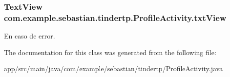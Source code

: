 \subsubsection[{\texorpdfstring{txt\+View}{txtView}}]{\setlength{\rightskip}{0pt plus 5cm}Text\+View com.\+example.\+sebastian.\+tindertp.\+Profile\+Activity.\+txt\+View\hspace{0.3cm}{\ttfamily [private]}}\hypertarget{classcom_1_1example_1_1sebastian_1_1tindertp_1_1ProfileActivity_afdb1940583ff0f43cf6e1c96e6ab1bb8}{}\label{classcom_1_1example_1_1sebastian_1_1tindertp_1_1ProfileActivity_afdb1940583ff0f43cf6e1c96e6ab1bb8}
En caso de error. 

The documentation for this class was generated from the following file\+:\begin{DoxyCompactItemize}
\item 
app/src/main/java/com/example/sebastian/tindertp/Profile\+Activity.\+java\end{DoxyCompactItemize}
